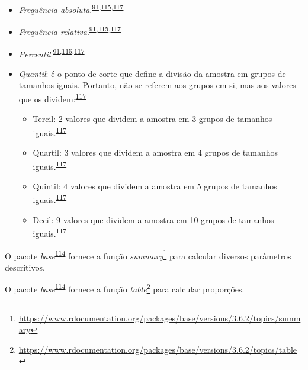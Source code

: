 \documentclass[
  a4paper,
]{book}
\renewcommand{\href}[2]{#2\footnote{\url{#1}}}
\newenvironment{infobox}[1]
  {
  \begin{itemize}
  \renewcommand{\labelitemi}{
    \raisebox{-.7\height}[0pt][0pt]{
      {\setkeys{Gin}{width=3em,keepaspectratio}
        \texttt{[image: \#1]}}
    }
  }
  \setlength{\fboxsep}{1em}
  \begin{blackbox}
  \item
  }
  {
  \end{blackbox}
  \end{itemize}
  }
\begin{document}
\begin{itemize}
\item
  \emph{Frequência absoluta}.\textsuperscript{\protect\hyperlink{ref-Ali2016}{91},\protect\hyperlink{ref-kanji2006}{115},\protect\hyperlink{ref-Altman1994}{117}}
\item
  \emph{Frequência relativa}.\textsuperscript{\protect\hyperlink{ref-Ali2016}{91},\protect\hyperlink{ref-kanji2006}{115},\protect\hyperlink{ref-Altman1994}{117}}
\item
  \emph{Percentil}.\textsuperscript{\protect\hyperlink{ref-Ali2016}{91},\protect\hyperlink{ref-kanji2006}{115},\protect\hyperlink{ref-Altman1994}{117}}
\item
  \emph{Quantil}: é o ponto de corte que define a divisão da amostra em grupos de tamanhos iguais. Portanto, não se referem aos grupos em si, mas aos valores que os dividem:\textsuperscript{\protect\hyperlink{ref-Altman1994}{117}}

  \begin{itemize}
  \item
    Tercil: 2 valores que dividem a amostra em 3 grupos de tamanhos iguais.\textsuperscript{\protect\hyperlink{ref-Altman1994}{117}}
  \item
    Quartil: 3 valores que dividem a amostra em 4 grupos de tamanhos iguais.\textsuperscript{\protect\hyperlink{ref-Altman1994}{117}}
  \item
    Quintil: 4 valores que dividem a amostra em 5 grupos de tamanhos iguais.\textsuperscript{\protect\hyperlink{ref-Altman1994}{117}}
  \item
    Decil: 9 valores que dividem a amostra em 10 grupos de tamanhos iguais.\textsuperscript{\protect\hyperlink{ref-Altman1994}{117}}
  \end{itemize}
\end{itemize}

\begin{infobox}{images/Rlogo}
O pacote \emph{base}\textsuperscript{\protect\hyperlink{ref-base-6}{114}} fornece a função \href{https://www.rdocumentation.org/packages/base/versions/3.6.2/topics/summary}{\emph{summary}} para calcular diversos parâmetros descritivos.

\end{infobox}

\begin{infobox}{images/Rlogo}
O pacote \emph{base}\textsuperscript{\protect\hyperlink{ref-base-6}{114}} fornece a função \href{https://www.rdocumentation.org/packages/base/versions/3.6.2/topics/table}{\emph{table}} para calcular proporções.

\end{infobox}
\end{document}
